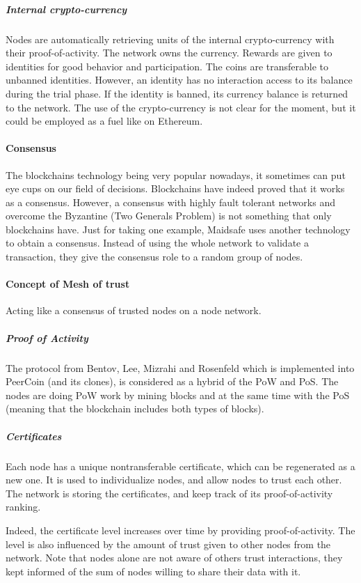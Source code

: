 \subparagraph{Internal crypto-currency} Nodes are automatically retrieving units of the internal crypto-currency with their proof-of-activity. The network owns the currency. Rewards are given to identities for good behavior and participation. The coins are transferable to unbanned identities. However, an identity has no interaction access to its balance during the trial phase. If the identity is banned, its currency balance is returned to the network. The use of the crypto-currency is not clear for the moment, but it could be employed as a fuel like on Ethereum\cite{Ethereum2016EthereumDocumentation}.

\paragraph{Consensus}
The blockchains technology being very popular nowadays, it sometimes can put eye cups on our field of decisions. Blockchains have indeed proved that it works as a consensus. However, a consensus with highly fault tolerant networks and overcome the Byzantine (Two Generals Problem) is not something that only blockchains have. Just for taking one example, Maidsafe\cite{MaidSafe2014MaidSafe.netCommunity} uses another technology to obtain a consensus\cite{Nick2015CONSENSUSBLOCKCHAIN}. Instead of using the whole network to validate a transaction, they give the consensus role to a random group of nodes.

\paragraph{Concept of Mesh of trust}
Acting like a consensus of trusted nodes on a node network.

\subparagraph{Proof of Activity}
The protocol from Bentov, Lee, Mizrahi and Rosenfeld \cite{Bentov2013ProofStake} which is implemented into PeerCoin (and its clones), is considered as a hybrid of the PoW and PoS. The nodes are doing PoW work by mining blocks and at the same time with the PoS (meaning that the blockchain includes both types of blocks).

\subparagraph{Certificates} Each node has a unique nontransferable certificate, which can be regenerated as a new one. It is used to individualize nodes, and allow nodes to trust each other. The network is storing the certificates, and keep track of its proof-of-activity\cite{Bentov2013ProofStake} ranking.

Indeed, the certificate level increases over time by providing proof-of-activity. The level is also influenced by the amount of trust given to other nodes from the network. Note that nodes alone are not aware of others trust interactions, they kept informed of the sum of nodes willing to share their data with it.

